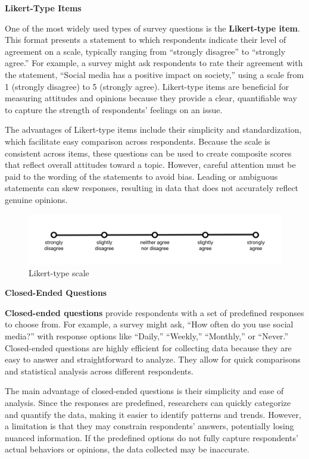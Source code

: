 \documentclass[
]{book}
\begin{document}
\textbf{Likert-Type Items}

One of the most widely used types of survey questions is the \textbf{Likert-type item}. This format presents a statement to which respondents indicate their level of agreement on a scale, typically ranging from ``strongly disagree'' to ``strongly agree.'' For example, a survey might ask respondents to rate their agreement with the statement, ``Social media has a positive impact on society,'' using a scale from 1 (strongly disagree) to 5 (strongly agree). Likert-type items are beneficial for measuring attitudes and opinions because they provide a clear, quantifiable way to capture the strength of respondents' feelings on an issue.

The advantages of Likert-type items include their simplicity and standardization, which facilitate easy comparison across respondents. Because the scale is consistent across items, these questions can be used to create composite scores that reflect overall attitudes toward a topic. However, careful attention must be paid to the wording of the statements to avoid bias. Leading or ambiguous statements can skew responses, resulting in data that does not accurately reflect genuine opinions.

\begin{figure}
\centering
\includegraphics[width=1\linewidth,height=\textheight,keepaspectratio]{images/likert-scale.png}
\caption{Likert-type scale}
\end{figure}

\textbf{Closed-Ended Questions}

\textbf{Closed-ended questions} provide respondents with a set of predefined responses to choose from. For example, a survey might ask, ``How often do you use social media?'' with response options like ``Daily,'' ``Weekly,'' ``Monthly,'' or ``Never.'' Closed-ended questions are highly efficient for collecting data because they are easy to answer and straightforward to analyze. They allow for quick comparisons and statistical analysis across different respondents.

The main advantage of closed-ended questions is their simplicity and ease of analysis. Since the responses are predefined, researchers can quickly categorize and quantify the data, making it easier to identify patterns and trends. However, a limitation is that they may constrain respondents' answers, potentially losing nuanced information. If the predefined options do not fully capture respondents' actual behaviors or opinions, the data collected may be inaccurate.
\end{document}
